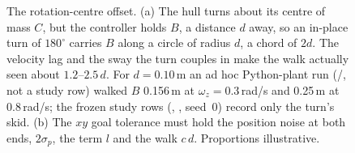 \begin{figure}[tbp]
\caption{The rotation-centre offset. (a) The hull turns about its centre of mass $C$, but
the controller holds  $B$, a distance $d$ away, so an in-place turn of
$180^\circ$ carries $B$ along a circle of radius $d$, a chord of $2d$. The velocity lag and
the sway the turn couples in make the walk actually seen about $1.2$--$2.5\,d$. For
$d = 0.10$\,m an ad hoc Python-plant run (/, not a study row) walked
$B$ 0.156\,m at $\omega_z = 0.3$\,rad/s and 0.25\,m at 0.8\,rad/s; the frozen study rows
(, , seed~0) record only the turn's skid. (b) The $xy$ goal
tolerance must hold the position noise at both ends, $2\sigma_p$, the term $l$ and the
walk $c\,d$. Proportions illustrative.}
\label{fig:spin}
\end{figure}

